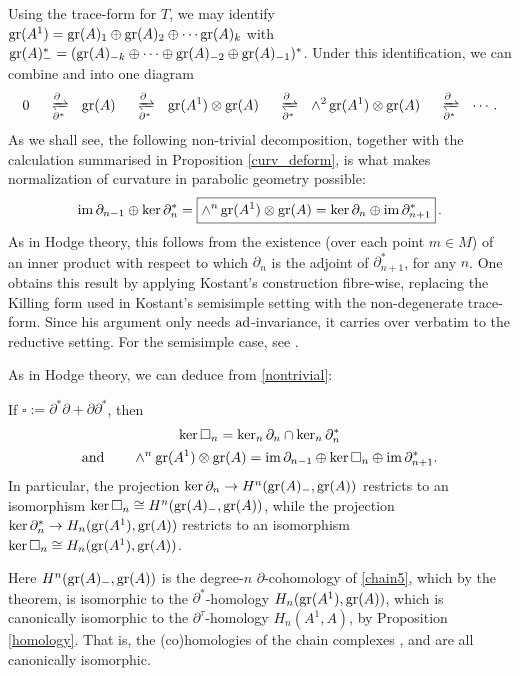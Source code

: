 \documentclass[leqno,12pt]{amsart} %
\begin{document}
Using the trace-form for $T$, we may identify
$\operatorname{\operatorname{gr}}(A^1)=\operatorname{\operatorname{gr}}(A)_1 \oplus \operatorname{\operatorname{gr}}(A)_2 \oplus \cdots \operatorname{\operatorname{gr}}(A)_k$ with
$\operatorname{\operatorname{gr}}(A)_{-}^*=(\operatorname{\operatorname{gr}}(A)_{-k}\oplus \cdots \oplus \operatorname{\operatorname{gr}}(A)_{-2}\oplus
\operatorname{\operatorname{gr}}(A)_{-1})^*$. Under this identification, we can combine
 and  into one diagram
\begin{equation}
  \label{chain5} 0 \xrightleftharpoons[\partial^*]{\partial}  \graded(A)
  \xrightleftharpoons[\partial^*]{\partial} \graded(A^1) \otimes \graded(A)
  \xrightleftharpoons[\partial^*]{\partial} \wedge^2 \graded(A^1) \otimes \graded(A)
  \xrightleftharpoons[\partial^*]{\partial} \cdots.
\end{equation}
As we shall see, the following non-trivial decomposition, together with the calculation
summarised in Proposition \ref{curv_deform}, is what makes normalization of curvature in
parabolic geometry possible:
\begin{equation}
  \label{nontrivial} \image\partial_{n-1}\oplus\kernel \partial_n^* =
  \boxed{\wedge^n \graded(A^1) \otimes \graded(A) =
  \kernel \partial_n \oplus \image \partial_{n+1}^*}\,.%
\end{equation}
As in Hodge theory, this follows from the existence (over each point $m \in M$) of an
inner product with respect to which $\partial_n$ is the adjoint of $\partial_{n+1}^*$, for
any $n$. One obtains this result by applying Kostant's construction fibre-wise, replacing
the Killing form used in Kostant's semisimple setting with the non-degenerate
trace-form. Since his argument only needs $\operatorname{ad}$-invariance, it carries over verbatim to the reductive setting.  For the semisimple case, see \cite[\S3.3]{Cap_Slovak_09}.

As in Hodge theory, we can deduce from \eqref{nontrivial}:

\begin{theorem}
  If $\square := \partial^* \partial + \partial \partial^*$, then
  \begin{gather}
    \operatorname{ker}\square_n = \operatorname{ker}_n \partial_n\cap \operatorname{ker}_n \partial_n^*\label{hodge1}\\
    \text{and}\qquad\wedge^n\operatorname{\operatorname{gr}}(A^1)\otimes \operatorname{\operatorname{gr}}(A) =
    \operatorname{im} \partial_{n-1} \oplus \operatorname{ker}\square_n \oplus \operatorname{im} \partial_{n+1}^*.
    \label{hodge2}
  \end{gather}
  In particular, the projection
  $\operatorname{ker} \partial_n \rightarrow H^n(\operatorname{\operatorname{gr}}(A)_-, \operatorname{\operatorname{gr}}(A))$ restricts to an
  isomorphism $\operatorname{ker} \square_n \cong H^n(\operatorname{\operatorname{gr}}(A)_-, \operatorname{\operatorname{gr}}(A))$, while the
  projection $\operatorname{ker} \partial_n^* \rightarrow H_n(\operatorname{\operatorname{gr}}(A^1), \operatorname{\operatorname{gr}}(A))$ restricts to
  an isomorphism $\operatorname{ker} \square_n \cong H_n(\operatorname{\operatorname{gr}}(A^1), \operatorname{\operatorname{gr}}(A))$.
\end{theorem}
\noindent%
Here $H^n(\operatorname{\operatorname{gr}}(A)_-, \operatorname{\operatorname{gr}}(A))$ is the degree-$n$ $\partial$-cohomology of
\eqref{chain5}, which by the theorem, is isomorphic to the $\partial^*$-homology
$H_n(\operatorname{\operatorname{gr}}(A^1), \operatorname{\operatorname{gr}}(A))$, which is canonically isomorphic to the
$\partial^\tau$-homology $H_n(A^1, A)$, by Proposition \ref{homology}. That is, the
(co)homologies of the chain complexes , 
and  are all canonically isomorphic.
\end{document}
